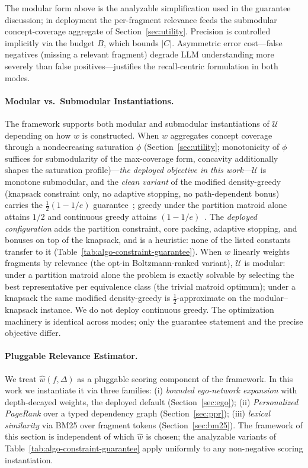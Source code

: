 \documentclass[11pt, a4paper]{article}
\begin{document}
The modular form above is the analyzable simplification used in the guarantee discussion; in deployment the per-fragment relevance feeds the submodular concept-coverage aggregate of Section~\ref{sec:utility}. Precision is controlled implicitly via the budget $B$, which bounds $|C|$. Asymmetric error cost---false negatives (missing a relevant fragment) degrade LLM understanding more severely than false positives---justifies the recall-centric formulation in both modes.

\paragraph{Modular vs.\ Submodular Instantiations.} The framework supports both modular and submodular instantiations of $\mathcal{U}$ depending on how $w$ is constructed. When $w$ aggregates concept coverage through a nondecreasing saturation $\phi$ (Section~\ref{sec:utility}; monotonicity of $\phi$ suffices for submodularity of the max-coverage form, concavity additionally shapes the saturation profile)---\emph{the deployed objective in this work}---$\mathcal{U}$ is monotone submodular, and the \emph{clean variant} of the modified density-greedy (knapsack constraint only, no adaptive stopping, no path-dependent bonus) carries the $\frac{1}{2}(1-1/e)$ guarantee~\cite{khuller1999budgeted,krause2005note}; greedy under the partition matroid alone attains $1/2$ and continuous greedy attains $(1-1/e)$~\cite{fisher1978analysis2,calinescu2011maximizing}. The \emph{deployed configuration} adds the partition constraint, core packing, adaptive stopping, and bonuses on top of the knapsack, and is a heuristic: none of the listed constants transfer to it (Table~\ref{tab:algo-constraint-guarantee}). When $w$ linearly weights fragments by relevance (the opt-in Boltzmann-ranked variant), $\mathcal{U}$ is modular: under a partition matroid alone the problem is exactly solvable by selecting the best representative per equivalence class (the trivial matroid optimum); under a knapsack the same modified density-greedy is $\frac{1}{2}$-approximate on the modular--knapsack instance. We do not deploy continuous greedy. The optimization machinery is identical across modes; only the guarantee statement and the precise objective differ.

\paragraph{Pluggable Relevance Estimator.} We treat $\hat{w}(f, \Delta)$ as a pluggable scoring component of the framework. In this work we instantiate it via three families: (i) \emph{bounded ego-network expansion} with depth-decayed weights, the deployed default (Section~\ref{sec:ego}); (ii) \emph{Personalized PageRank} over a typed dependency graph (Section~\ref{sec:ppr}); (iii) \emph{lexical similarity} via BM25 over fragment tokens (Section~\ref{sec:bm25}). The framework of this section is independent of which $\hat{w}$ is chosen; the analyzable variants of Table~\ref{tab:algo-constraint-guarantee} apply uniformly to any non-negative scoring instantiation.
\end{document}
